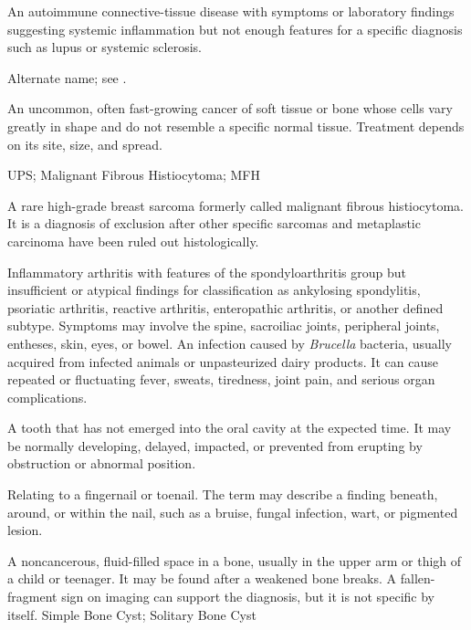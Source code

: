  An autoimmune connective-tissue disease with symptoms or laboratory findings suggesting systemic inflammation but not enough features for a specific diagnosis such as lupus or systemic sclerosis.

 Alternate name; see .

 An uncommon, often fast-growing cancer of soft tissue or bone whose cells vary greatly in shape and do not resemble a specific normal tissue. Treatment depends on its site, size, and spread.

\synonyms
UPS; Malignant Fibrous Histiocytoma; MFH

 A rare high-grade breast sarcoma formerly called malignant fibrous histiocytoma. It is a diagnosis of exclusion after other specific sarcomas and metaplastic carcinoma have been ruled out histologically.

 Inflammatory arthritis with features of the spondyloarthritis group but insufficient or atypical findings for classification as ankylosing spondylitis, psoriatic arthritis, reactive arthritis, enteropathic arthritis, or another defined subtype. Symptoms may involve the spine, sacroiliac joints, peripheral joints, entheses, skin, eyes, or bowel.
 An infection caused by \textit{Brucella} bacteria, usually acquired from infected animals or unpasteurized dairy products. It can cause repeated or fluctuating fever, sweats, tiredness, joint pain, and serious organ complications.

 A tooth that has not emerged into the oral cavity at the expected time. It may be normally developing, delayed, impacted, or prevented from erupting by obstruction or abnormal position.

 Relating to a fingernail or toenail. The term may describe a finding beneath, around, or within the nail, such as a bruise, fungal infection, wart, or pigmented lesion.

 A noncancerous, fluid-filled space in a bone, usually in the upper arm or thigh of a child or teenager. It may be found after a weakened bone breaks. A fallen-fragment sign on imaging can support the diagnosis, but it is not specific by itself.
\synonyms
Simple Bone Cyst; Solitary Bone Cyst

